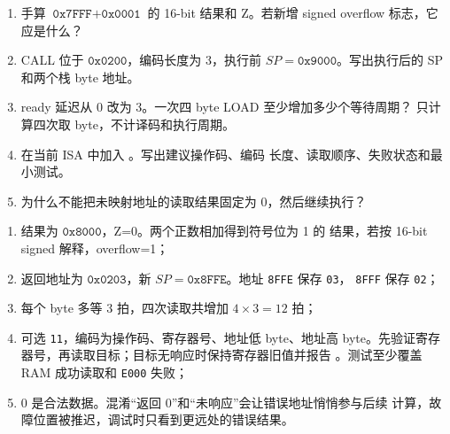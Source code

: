 
\begin{enumerate}[leftmargin=2.2em]
  \item 手算 \(\texttt{0x7FFF}+\texttt{0x0001}\) 的 16-bit 结果和 Z。若新增
    signed overflow 标志，它应是什么？
  \item CALL 位于 \(\texttt{0x0200}\)，编码长度为 3，执行前
    \(SP=\texttt{0x9000}\)。写出执行后的 SP 和两个栈 byte 地址。
  \item ready 延迟从 0 改为 3。一次四 byte LOAD 至少增加多少个等待周期？
    只计算四次取 byte，不计译码和执行周期。
  \item 在当前 ISA 中加入 。写出建议操作码、编码
    长度、读取顺序、失败状态和最小测试。
  \item 为什么不能把未映射地址的读取结果固定为 0，然后继续执行？
\end{enumerate}

\begin{answerbox}
\begin{enumerate}[leftmargin=2.2em]
  \item 结果为 \(\texttt{0x8000}\)，Z=0。两个正数相加得到符号位为 1 的
    结果，若按 16-bit signed 解释，overflow=1；
  \item 返回地址为 \(\texttt{0x0203}\)，新
    \(SP=\texttt{0x8FFE}\)。地址 \texttt{8FFE} 保存 \texttt{03}，
    \texttt{8FFF} 保存 \texttt{02}；
  \item 每个 byte 多等 3 拍，四次读取共增加 \(4\times3=12\) 拍；
  \item 可选 \texttt{11}，编码为操作码、寄存器号、地址低 byte、地址高
    byte。先验证寄存器号，再读取目标；目标无响应时保持寄存器旧值并报告
    。测试至少覆盖 RAM 成功读取和
    \texttt{E000} 失败；
  \item 0 是合法数据。混淆“返回 0”和“未响应”会让错误地址悄悄参与后续
    计算，故障位置被推迟，调试时只看到更远处的错误结果。
\end{enumerate}
\end{answerbox}
